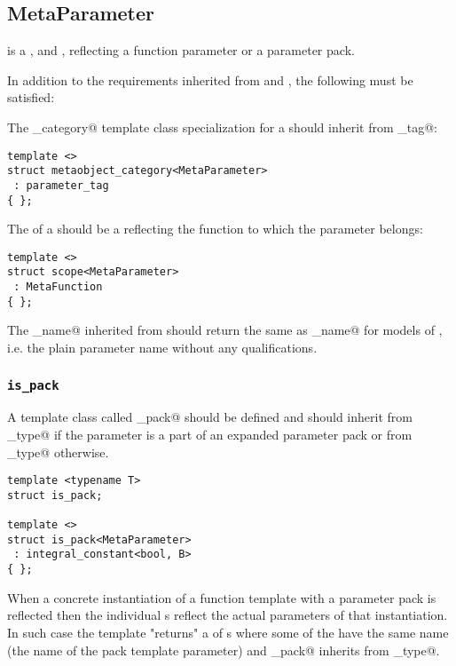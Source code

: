 \subsection{MetaParameter}
\label{concept-MetaParameter}

 is a ,  and ,
reflecting a function parameter or a parameter pack.

In addition to the requirements inherited from  and ,
the following must be satisfied:

The \verb@metaobject_category@ template class specialization for a  should
inherit from \verb@parameter_tag@:

\begin{verbatim}
template <>
struct metaobject_category<MetaParameter>
 : parameter_tag
{ };
\end{verbatim}

The \verb@scope@ of a  should be a  reflecting
the function to which the parameter belongs:

\begin{verbatim}
template <>
struct scope<MetaParameter>
 : MetaFunction
{ };
\end{verbatim}

The \verb@full_name@ inherited from  should return the same 
as \verb@base_name@ for models of , i.e. the plain parameter
name without any qualifications.

\subsubsection{\texttt{is\_pack}}

A template class called \verb@is_pack@ should be defined and should
inherit from \verb@true_type@ if the parameter is a part of an expanded
parameter pack or from \verb@false_type@ otherwise.

\begin{verbatim}
template <typename T>
struct is_pack;

template <>
struct is_pack<MetaParameter>
 : integral_constant<bool, B>
{ };
\end{verbatim}

When a concrete instantiation of a function template with a parameter pack
is reflected then the individual s reflect the actual parameters
of that instantiation. In such case the \verb@parameters@ template "returns"
a  of s where some of the 
have the same name (the name of the pack template parameter)
and \verb@is_pack@ inherits from \verb@true_type@.

